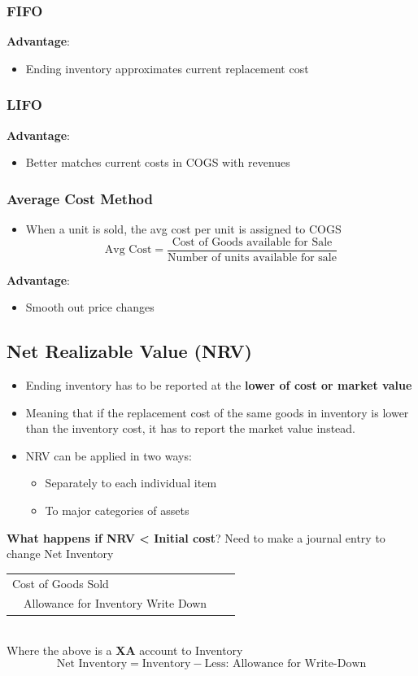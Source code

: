 \documentclass{article}
\begin{document}
\begin{multicols}{2}
\subsubsection{FIFO}
\textbf{Advantage}:
\begin{itemize}
	\item Ending inventory approximates current replacement cost
\end{itemize}
\subsubsection{LIFO}
\textbf{Advantage}:
\begin{itemize}
	\item Better matches current costs in COGS with revenues
\end{itemize}
\subsubsection{Average Cost Method}
\begin{itemize}
	\item When a unit is sold, the avg cost per unit is assigned to COGS
	$$\text{Avg Cost} = \frac{\text{Cost of Goods available for Sale}}{\text{Number of units available for sale}}$$
\end{itemize}
\textbf{Advantage}:
\begin{itemize}
	\item Smooth out price changes
\end{itemize}
\subsection{Net Realizable Value (NRV)}
\begin{itemize}
	\item Ending inventory has to be reported at the \textbf{lower of cost or market value}
	\item Meaning that if the replacement cost of the same goods in inventory is lower than the inventory cost, it has to report the market value instead.
	\item NRV can be applied in two ways:
	\begin{itemize}
		\item Separately to each individual item
		\item To major categories of assets
	\end{itemize}
\end{itemize}
\textbf{What happens if NRV < Initial cost}? Need to make a journal entry to change Net Inventory\vspace{0.5em}\\
\begin{tabular}{llll}
	\multicolumn{4}{l}{Cost of Goods Sold}\\
	& Allowance for Inventory Write Down& &
\end{tabular}\vspace{0.5em}\\
Where the above is a \textbf{XA} account to Inventory
$$\text{Net Inventory} = \text{Inventory} - \text{Less: Allowance for Write-Down}$$


\end{multicols}
\end{document}
